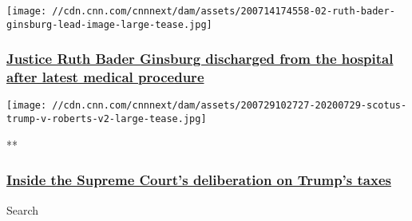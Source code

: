\href{/2020/07/31/politics/ruth-bader-ginsburg-discharged/index.html}{}

\texttt{[image: //cdn.cnn.com/cnnnext/dam/assets/200714174558-02-ruth-bader-ginsburg-lead-image-large-tease.jpg]}

\hypertarget{justice-ruth-bader-ginsburg-discharged-from-the-hospital-after-latest-medical-procedure}{%
\subsubsection{\texorpdfstring{\href{/2020/07/31/politics/ruth-bader-ginsburg-discharged/index.html}{Justice
Ruth Bader Ginsburg discharged from the hospital after latest medical
procedure}}{Justice Ruth Bader Ginsburg discharged from the hospital after latest medical procedure}}\label{justice-ruth-bader-ginsburg-discharged-from-the-hospital-after-latest-medical-procedure}}

\href{/videos/politics/2020/07/30/supreme-court-trump-taxes-biskupic-newday-vpx.cnn}{}

\texttt{[image: //cdn.cnn.com/cnnnext/dam/assets/200729102727-20200729-scotus-trump-v-roberts-v2-large-tease.jpg]}

**

\hypertarget{inside-the-supreme-courts-deliberation-on-trumps-taxes}{%
\subsubsection{\texorpdfstring{\href{/videos/politics/2020/07/30/supreme-court-trump-taxes-biskupic-newday-vpx.cnn}{Inside
the Supreme Court's deliberation on Trump's
taxes}}{Inside the Supreme Court's deliberation on Trump's taxes}}\label{inside-the-supreme-courts-deliberation-on-trumps-taxes}}

Search


